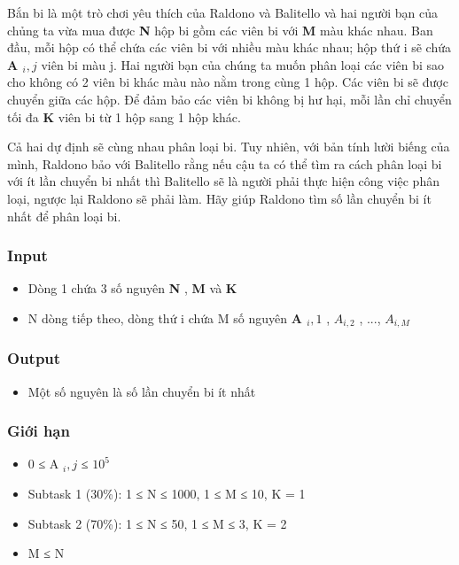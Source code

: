 



   Bắn bi là một trò chơi yêu thích của Raldono và Balitello và hai người bạn của chủng ta vừa mua được   \textbf{    N   }   hộp bi gồm các viên bi với   \textbf{    M   }   màu khác nhau. Ban đầu, mỗi hộp có thể chứa các viên bi với nhiều màu khác nhau; hộp thứ i sẽ chứa   \textbf{    A    $_     i, j    $}   viên bi màu j. Hai người bạn của chúng ta muốn phân loại các viên bi sao cho không có 2 viên bi khác màu nào nằm trong cùng 1 hộp. Các viên bi sẽ được chuyển giữa các hộp. Để đảm bảo các viên bi không bị hư hại, mỗi lần chỉ chuyển tối đa   \textbf{    K   }   viên bi từ 1 hộp sang 1 hộp khác.  

   Cả hai dự định sẽ cùng nhau phân loại bi. Tuy nhiên, với bản tính lười biếng của mình, Raldono bảo với Balitello rằng nếu cậu ta có thể tìm ra cách phân loại bi với ít lần chuyển bi nhất thì Balitello sẽ là người phải thực hiện công việc phân loại, ngược lại Raldono sẽ phải làm. Hãy giúp Raldono tìm số lần chuyển bi ít nhất để phân loại bi.  

\subsubsection{   Input  }
\begin{itemize}
	\item     Dòng 1 chứa 3 số nguyên    \textbf{     N    }    ,    \textbf{     M    }    và    \textbf{     K    }
	\item     N dòng tiếp theo, dòng thứ i chứa M số nguyên    \textbf{     A     $_      i, 1     $}    ,    \textbf{     $A_{i,2}$}    , ...,    \textbf{     $A_{i,M}$}
\end{itemize}

\subsubsection{   Output  }
\begin{itemize}
	\item     Một số nguyên là số lần chuyển bi ít nhất   
\end{itemize}

\subsubsection{   Giới hạn  }
\begin{itemize}
	\item     0 ≤ A    $_     i, j    $    ≤ $10^{5}$
	\item     Subtask 1 (30\%): 1 ≤ N ≤ 1000, 1 ≤ M ≤ 10, K = 1   
	\item     Subtask 2 (70\%): 1 ≤ N ≤ 50, 1 ≤ M ≤ 3, K = 2   
	\item     M ≤ N   
\end{itemize}


